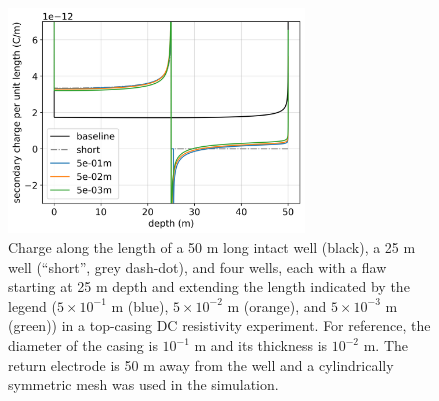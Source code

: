 \begin{figure}
    \begin{center}
    \includegraphics[width=0.7\textwidth]{figures/dc_casing/casing_charge_flawdz.png}
    \end{center}
\caption{
    Charge along the length of a 50 m long intact well (black),
    a 25 m well (``short'', grey dash-dot), and four wells, each with a flaw
    starting at 25 m depth and extending the length indicated by the legend
    ($5 \times 10^{-1}$ m (blue), $5 \times 10^{-2}$ m (orange), and $5 \times 10^{-3}$ m (green))
    in a top-casing DC resistivity experiment.
    For reference, the diameter of the casing is $10^{-1}$ m and its thickness is $10^{-2}$ m.
    The return electrode
    is 50 m away from the well and a cylindrically symmetric mesh was used in the simulation.
}
\label{fig:casing_charge_flawdz}
\end{figure}
